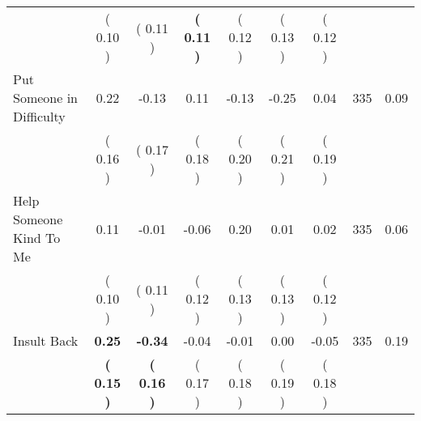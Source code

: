 \begin{tabular}{lcccccccc}
 & (     0.10 ) & (     0.11 ) & \textbf{(     0.11 )} & (     0.12 ) & (     0.13 ) & (     0.12 ) & \\
Put Someone in Difficulty &      0.22 &     -0.13 &      0.11 &     -0.13 &     -0.25 &      0.04 & 335 &       0.09 \\ 
 & (     0.16 ) & (     0.17 ) & (     0.18 ) & (     0.20 ) & (     0.21 ) & (     0.19 ) & \\
Help Someone Kind To Me &      0.11 &     -0.01 &     -0.06 &      0.20 &      0.01 &      0.02 & 335 &       0.06 \\ 
 & (     0.10 ) & (     0.11 ) & (     0.12 ) & (     0.13 ) & (     0.13 ) & (     0.12 ) & \\
Insult Back & \textbf{     0.25} & \textbf{    -0.34} &     -0.04 &     -0.01 &      0.00 &     -0.05 & 335 &       0.19 \\ 
 & \textbf{(     0.15 )} & \textbf{(     0.16 )} & (     0.17 ) & (     0.18 ) & (     0.19 ) & (     0.18 ) & \\
\bottomrule
\end{tabular}
